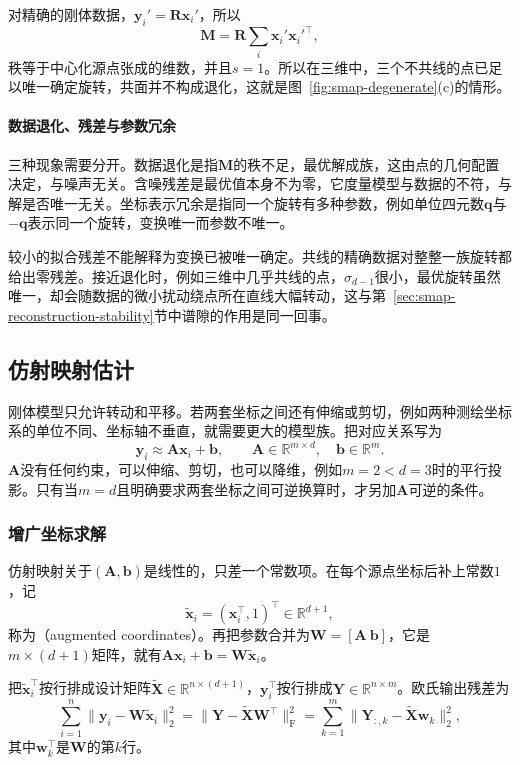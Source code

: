 对精确的刚体数据，$\bm y_i'=\bm R\bm x_i'$，所以
\[
 \bm M=\bm R\sum_i\bm x_i'\bm x_i'^\top ,
\]
秩等于中心化源点张成的维数，并且$s=1$。所以在三维中，三个不共线的点已足以唯一确定旋转，共面并不构成退化，这就是图~\ref{fig:smap-degenerate}(c)的情形。

\paragraph{数据退化、残差与参数冗余}

三种现象需要分开。数据退化是指$\bm M$的秩不足，最优解成族，这由点的几何配置决定，与噪声无关。含噪残差是最优值本身不为零，它度量模型与数据的不符，与解是否唯一无关。坐标表示冗余是指同一个旋转有多种参数，例如单位四元数$\bm q$与$-\bm q$表示同一个旋转，变换唯一而参数不唯一。

较小的拟合残差不能解释为变换已被唯一确定。共线的精确数据对整整一族旋转都给出零残差。接近退化时，例如三维中几乎共线的点，$\sigma_{d-1}$很小，最优旋转虽然唯一，却会随数据的微小扰动绕点所在直线大幅转动，这与第~\ref{sec:smap-reconstruction-stability}节中谱隙的作用是同一回事。

\subsection{仿射映射估计}
\label{sec:smap-affine}

刚体模型只允许转动和平移。若两套坐标之间还有伸缩或剪切，例如两种测绘坐标系的单位不同、坐标轴不垂直，就需要更大的模型族。把对应关系写为
\begin{equation}
 \bm y_i\approx\bm A\bm x_i+\bm b,\qquad\bm A\in\mathbb R^{m\times d},\quad\bm b\in\mathbb R^m .
 \label{eq:smap-affine-model}
\end{equation}
$\bm A$没有任何约束，可以伸缩、剪切，也可以降维，例如$m=2<d=3$时的平行投影。只有当$m=d$且明确要求两套坐标之间可逆换算时，才另加$\bm A$可逆的条件。

\subsubsection{增广坐标求解}
\label{sec:smap-augmented}

仿射映射关于$(\bm A,\bm b)$是线性的，只差一个常数项。在每个源点坐标后补上常数$1$，记
\[
 \widetilde{\bm x}_i=(\bm x_i^\top,1)^\top\in\mathbb R^{d+1} ,
\]
称为（augmented coordinates）。再把参数合并为$\bm W=[\bm A\ \bm b]$，它是$m\times(d+1)$矩阵，就有$\bm A\bm x_i+\bm b=\bm W\widetilde{\bm x}_i$。

把$\widetilde{\bm x}_i^\top$按行排成设计矩阵$\widetilde{\bm X}\in\mathbb R^{n\times(d+1)}$，$\bm y_i^\top$按行排成$\bm Y\in\mathbb R^{n\times m}$。欧氏输出残差为
\begin{equation}
 \sum_{i=1}^n\lVert\bm y_i-\bm W\widetilde{\bm x}_i\rVert_2^2
 =\lVert\bm Y-\widetilde{\bm X}\bm W^\top\rVert_{\mathrm F}^2
 =\sum_{k=1}^m\lVert\bm Y_{:,k}-\widetilde{\bm X}\bm w_k\rVert_2^2 ,
 \label{eq:smap-affine-objective}
\end{equation}
其中$\bm w_k^\top$是$\bm W$的第$k$行。

